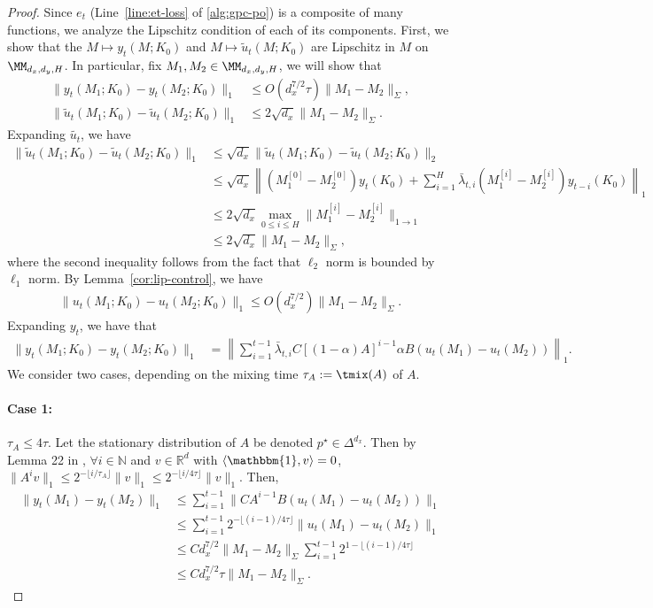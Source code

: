 \begin{proof}
Since $e_t$ (Line~\ref{line:et-loss} of \cref{alg:gpc-po}) is a composite of many functions, we analyze the Lipschitz condition of each of its components. First, we show that the $M\mapsto y_t(M;K_0)$ and $M\mapsto \tilde{u}_t(M;K_0)$ are Lipschitz in $M$ on $\MM_{d_x,d_y,H}$.
In particular, fix $M_1,M_2\in\MM_{d_x,d_y,H}$, we will show that 
\begin{align*}
\|y_t(M_1;K_0)-y_t(M_2;K_0)\|_1&\le O(d_x^{7/2}\tau) \|M_1-M_2\|_{\Sigma}, \\ 
\|\tilde{u}_t(M_1;K_0)-\tilde{u}_t(M_2;K_0)\|_1&\le 2\sqrt{d_x} \|M_1-M_2\|_{\Sigma}.
\end{align*}
Expanding $\tilde{u_t}$, we have
\begin{align*}
\|\tilde{u}_t(M_1;K_0)-\tilde{u}_t(M_2;K_0)\|_1&\le \sqrt{d_x}\|\tilde{u}_t(M_1;K_0)-\tilde{u}_t(M_2;K_0)\|_2\\
&\le \sqrt{d_x}\left\|(M_1^{[0]}-M_2^{[0]})y_t(K_0)+\sum_{i=1}^H\bar{\lambda}_{t,i}(M_1^{[i]}-M_2^{[i]})y_{t-i}(K_0)\right\|_1\\
&\le 2\sqrt{d_x} \max_{0\le i\le H} \|M_1^{[i]}-M_2^{[i]}\|_{1\rightarrow 1} \\
&\le 2\sqrt{d_x}\|M_1-M_2\|_{\Sigma},
\end{align*}
where the second inequality follows from the fact that $\ell_2$ norm is bounded by $\ell_1$ norm. By Lemma~\ref{cor:lip-control}, we have
\begin{align*}
\|u_t(M_1;K_0)-u_t(M_2;K_0)\|_1\le O(d_x^{7/2})\|M_1-M_2\|_{\Sigma}.
\end{align*}
Expanding $y_t$, we have that
\begin{align*}
\|y_t(M_1;K_0)-y_t(M_2;K_0)\|_1&=\left\|\sum_{i=1}^{t-1}\bar{\lambda}_{t,i}C[(1-\alpha)A]^{i-1}\alpha B(u_t(M_1)-u_t(M_2))\right\|_1.
\end{align*}
We consider two cases, depending on the mixing time $\tau_A:=\tmix(A)$ of $A$. 

\paragraph{Case 1:} $\tau_A\le 4\tau$. Let the stationary distribution of $A$ be denoted $p^{\star}\in\Delta^{d_x}$. Then by Lemma 22 in \cite{golowich2024online}, $\forall i\in\mathbb{N}$ and $v\in\mathbb{R}^d$ with $\langle \mathbbm{1}, v\rangle=0$, $\|A^{i}v\|_1\le 2^{-\lfloor i/\tau_A\rfloor}\|v\|_1\le 2^{-\lfloor i/4\tau\rfloor}\|v\|_1$. Then,
\begin{align*}
\|y_t(M_1)-y_t(M_2)\|_1&\le \sum_{i=1}^{t-1} \|CA^{i-1}B(u_t(M_1)-u_t(M_2))\|_1\\
&\le \sum_{i=1}^{t-1} 2^{-\lfloor (i-1)/4\tau\rfloor}\|u_t(M_1)-u_t(M_2)\|_1\\
&\le Cd_x^{7/2}\|M_1-M_2\|_{\Sigma}\sum_{i=1}^{t-1} 2^{1-\lfloor (i-1)/4\tau\rfloor}\\
&\le Cd_x^{7/2}\tau \|M_1-M_2\|_{\Sigma}. 
\end{align*}


\end{proof}
